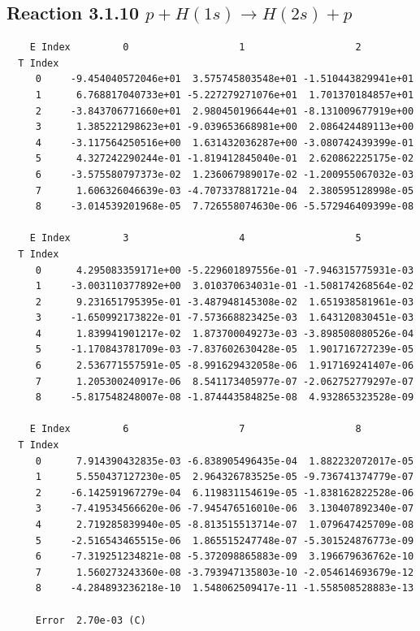 \documentclass[12pt,dvipdfmx]{article}
\begin{document}
\newpage
\subsection{
Reaction 3.1.10 $  p + H(1s) \rightarrow H(2s) + p$}


\begin{small}\begin{verbatim}
    E Index         0                   1                   2
  T Index
     0     -9.454040572046e+01  3.575745803548e+01 -1.510443829941e+01
     1      6.768817040733e+01 -5.227279271076e+01  1.701370184857e+01
     2     -3.843706771660e+01  2.980450196644e+01 -8.131009677919e+00
     3      1.385221298623e+01 -9.039653668981e+00  2.086424489113e+00
     4     -3.117564250516e+00  1.631432036287e+00 -3.080742439399e-01
     5      4.327242290244e-01 -1.819412845040e-01  2.620862225175e-02
     6     -3.575580797373e-02  1.236067989017e-02 -1.200955067032e-03
     7      1.606326046639e-03 -4.707337881721e-04  2.380595128998e-05
     8     -3.014539201968e-05  7.726558074630e-06 -5.572946409399e-08

    E Index         3                   4                   5
  T Index
     0      4.295083359171e+00 -5.229601897556e-01 -7.946315775931e-03
     1     -3.003110377892e+00  3.010370634031e-01 -1.508174268564e-02
     2      9.231651795395e-01 -3.487948145308e-02  1.651938581961e-03
     3     -1.650992173822e-01 -7.573668823425e-03  1.643120830451e-03
     4      1.839941901217e-02  1.873700049273e-03 -3.898508080526e-04
     5     -1.170843781709e-03 -7.837602630428e-05  1.901716727239e-05
     6      2.536771557591e-05 -8.991629432058e-06  1.917169241407e-06
     7      1.205300240917e-06  8.541173405977e-07 -2.062752779297e-07
     8     -5.817548248007e-08 -1.874443584825e-08  4.932865323528e-09

    E Index         6                   7                   8
  T Index
     0      7.914390432835e-03 -6.838905496435e-04  1.882232072017e-05
     1      5.550437127230e-05  2.964326783525e-05 -9.736741374779e-07
     2     -6.142591967279e-04  6.119831154619e-05 -1.838162822528e-06
     3     -7.419534566620e-06 -7.945476516010e-06  3.130407892340e-07
     4      2.719285839940e-05 -8.813515513714e-07  1.079647425709e-08
     5     -2.516543465515e-06  1.865515247748e-07 -5.301524876773e-09
     6     -7.319251234821e-08 -5.372098865883e-09  3.196679636762e-10
     7      1.560273243360e-08 -3.793947135803e-10 -2.054614693679e-12
     8     -4.284893236218e-10  1.548062509417e-11 -1.558508528883e-13

     Error  2.70e-03 (C)
\end{verbatim}\end{small}
\end{document}
